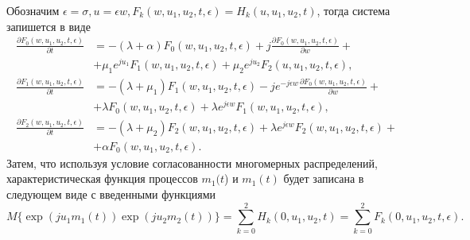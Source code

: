 Обозначим $\epsilon = \sigma,   u= \epsilon w,   F_{k}(w,u_{1},u_{2},t,\epsilon) = H_{k}(u,u_{1},u_{2},t)$, тогда система запишется в виде
\begin{equation} \label{asymptotic_equations_twodim}
	\begin{split}
		\frac{{\partial F_{0}(w,u_{1},u_{2},t,\epsilon)}}{{\partial t}} &= -(\lambda + \alpha)F_{0}(w,u_{1},u_{2},t,\epsilon) + j
		\frac{{\partial F_{0}(w,u_{1},u_{2},t,\epsilon)}}{{\partial w}} +\\  &+ \mu_{1} e^{ju_{1}}F_{1}(w,u_{1},u_{2},t,\epsilon) + \mu_{2}e^{ju_{2}}F_{2}(u,u_{1},u_{2},t,\epsilon) ,
		\\
		\frac{{\partial F_{1}(w,u_{1},u_{2},t,\epsilon)}}{{\partial t}} &= -(\lambda + \mu_{1})F_{1}(w,u_{1},u_{2},t,\epsilon) - j e^{-j\epsilon w}
		\frac{{\partial F_{0}(w,u_{1},u_{2},t,\epsilon)}}{{\partial w}} +\\  &+ \lambda F_{0}(w,u_{1},u_{2},t,\epsilon) + \lambda e^{j\epsilon w}F_{1}(w,u_{1},u_{2},t,\epsilon) ,
		\\
		\frac{{\partial F_{2}(w,u_{1},u_{2},t,\epsilon)}}{{\partial t}} &= -(\lambda + \mu_{2})F_{2}(w,u_{1},u_{2},t,\epsilon)  + \lambda e^{j\epsilon w}F_{2}(w,u_{1},u_{2},t,\epsilon) +\\  &+ \alpha F_{0}(w,u_{1},u_{2},t,\epsilon).
	\end{split}
\end{equation}  
Затем, что используя условие согласованности многомерных распределений, характеристическая функция процессов $m_{1}(t$) и $m_{1}(t)$ будет записана в следующем виде с введенными функциями 
\begin{equation*}
	M\{\exp(ju_{1}m_{1}(t))\exp(ju_{2}m_{2}(t))\}=\sum_{k=0}^{2}H_{k}(0,u_{1},u_{2},t) = \sum_{k=0}^{2}F_{k}(0,u_{1},u_{2},t,\epsilon).
\end{equation*}

